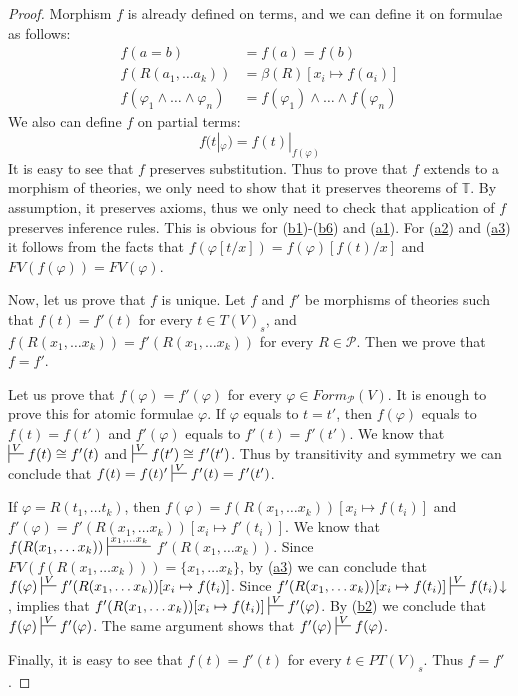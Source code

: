 \documentclass{elsarticle}
\newcommand{\axref}[1]{(\hyperref[ax:#1]{#1})}
\theoremstyle{definition}
\theoremstyle{remark}
\numberwithin{figure}{section}
\begin{document}
\begin{proof}
Morphism $f$ is already defined on terms, and we can define it on formulae as follows:
\begin{align*}
f(a = b) & = f(a) = f(b) \\
f(R(a_1, \ldots a_k)) & = \beta(R)[x_i \mapsto f(a_i)] \\
f(\varphi_1 \land \ldots \land \varphi_n) & = f(\varphi_1) \land \ldots \land f(\varphi_n)
\end{align*}
We also can define $f$ on partial terms:
\[ f(t|_\varphi) = f(t)|_{f(\varphi)} \]
It is easy to see that $f$ preserves substitution.
Thus to prove that $f$ extends to a morphism of theories, we only need to show that it preserves theorems of $\mathbb{T}$.
By assumption, it preserves axioms, thus we only need to check that application of $f$ preserves inference rules.
This is obvious for \axref{b1}-\axref{b6} and \axref{a1}.
For \axref{a2} and \axref{a3} it follows from the facts that $f(\varphi[t/x]) = f(\varphi)[f(t)/x]$ and $FV(f(\varphi)) = FV(\varphi)$.

Now, let us prove that $f$ is unique.
Let $f$ and $f'$ be morphisms of theories such that $f(t) = f'(t)$ for every $t \in T(V)_s$, and
    $f(R(x_1, \ldots x_k)) = f'(R(x_1, \ldots x_k))$ for every $R \in \mathcal{P}$.
Then we prove that $f = f'$.

Let us prove that $f(\varphi) = f'(\varphi)$ for every $\varphi \in Form_\mathcal{P}(V)$.
It is enough to prove this for atomic formulae $\varphi$.
If $\varphi$ equals to $t = t'$, then $f(\varphi)$ equals to $f(t) = f(t')$ and $f'(\varphi)$ equals to $f'(t) = f'(t')$.
We know that $\sststile{}{V} f(t) \cong f'(t)$ and $\sststile{}{V} f(t') \cong f'(t')$.
Thus by transitivity and symmetry we can conclude that $f(t) = f(t)' \sststile{}{V} f'(t) = f'(t')$.

If $\varphi = R(t_1, \ldots t_k)$, then $f(\varphi) = f(R(x_1, \ldots x_k))[x_i \mapsto f(t_i)]$
    and $f'(\varphi) = f'(R(x_1, \ldots x_k))[x_i \mapsto f'(t_i)]$.
We know that $f(R(x_1, \ldots x_k)) \sststile{}{x_1, \ldots x_k}$ \linebreak $f'(R(x_1, \ldots x_k))$.
Since $FV(f(R(x_1, \ldots x_k))) = \{ x_1, \ldots x_k \}$, by \axref{a3} we can conclude that $f(\varphi) \sststile{}{V} f'(R(x_1, \ldots x_k))[x_i \mapsto f(t_i)]$.
Since $f'(R(x_1, \ldots x_k))[x_i \mapsto f(t_i)] \sststile{}{V} f(t_i)\!\downarrow$,  implies that
    $f'(R(x_1, \ldots x_k))[x_i \mapsto f(t_i)] \sststile{}{V} f'(\varphi)$.
By \axref{b2} we conclude that $f(\varphi) \sststile{}{V} f'(\varphi)$.
The same argument shows that $f'(\varphi) \sststile{}{V} f(\varphi)$.

Finally, it is easy to see that $f(t) = f'(t)$ for every $t \in PT(V)_s$.
Thus $f = f'$.
\end{proof}
\end{document}

